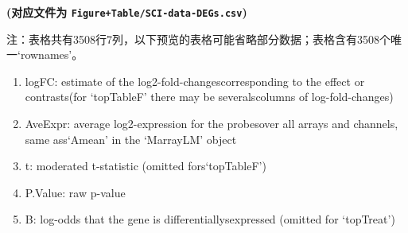 \documentclass[
]{article}
\providecommand{\tightlist}{%
  \setlength{\itemsep}{0pt}\setlength{\parskip}{0pt}}
\begin{document}
\textbf{(对应文件为 \texttt{Figure+Table/SCI-data-DEGs.csv})}

\begin{center}\begin{tcolorbox}[colback=gray!10, colframe=gray!50, width=0.9\linewidth, arc=1mm, boxrule=0.5pt]注：表格共有3508行7列，以下预览的表格可能省略部分数据；表格含有3508个唯一`rownames'。
\end{tcolorbox}
\end{center}
\begin{center}\begin{tcolorbox}[colback=gray!10, colframe=gray!50, width=0.9\linewidth, arc=1mm, boxrule=0.5pt]\begin{enumerate}\tightlist
\item logFC: estimate of the log2-fold-changescorresponding to the effect or contrasts(for ‘topTableF’ there may be severalscolumns of log-fold-changes)
\item AveExpr: average log2-expression for the probesover all arrays and channels, same ass‘Amean’ in the ‘MarrayLM’ object
\item t: moderated t-statistic (omitted fors‘topTableF’)
\item P.Value: raw p-value
\item B: log-odds that the gene is differentiallysexpressed (omitted for ‘topTreat’)
\end{enumerate}\end{tcolorbox}
\end{center}
\end{document}
